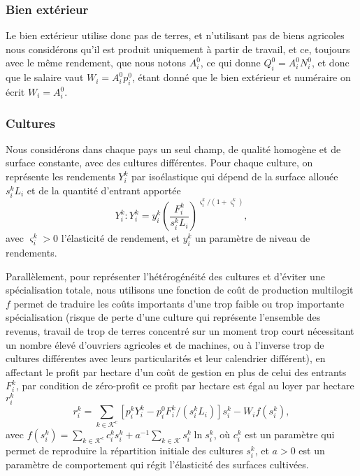 \subsubsection{Bien extérieur}
Le bien extérieur utilise donc pas de terres, et n’utilisant pas de biens agricoles nous considérons qu’il est produit uniquement à partir de travail, et ce, toujours avec le même rendement, que nous notons $A_i^0$, ce qui donne $Q_i^0 = A_i^0 N_i^0$, et donc que le salaire vaut $W_i = A_i^0 p_i^0$, étant donné que le bien extérieur et numéraire on écrit $W_i=A_i^0$.

\subsubsection{Cultures}

Nous considérons dans chaque pays un seul champ, de qualité homogène et de surface constante, avec des cultures différentes. Pour chaque culture, on représente les rendements $Y_i^k$ par isoélastique qui dépend de la surface allouée $s_i^k L_i$ et de la quantité d’entrant apportée
\begin{equation}\label{eq_yik}
	Y_i^k: Y_i^k = y_i^k \left( \frac{F_i^k}{s_i^k L_i} \right) ^{\varsigma_i^k/(1+\varsigma_i^k)},
\end{equation}
avec $\varsigma_i^k > 0$ l’élasticité de rendement, et $y_i^k$ un paramètre de niveau de rendements.

Parallèlement, pour représenter l’hétérogénéité des cultures et d’éviter une spécialisation totale, nous utilisons une fonction de coût de production multilogit $f$ permet de traduire les coûts importants d’une trop faible ou trop importante spécialisation (risque de perte d’une culture qui représente l’ensemble des revenus, travail de trop de terres concentré sur un moment trop court nécessitant un nombre élevé d’ouvriers agricoles et de machines, ou à l’inverse trop de cultures différentes avec leurs particularités et leur calendrier différent), en affectant le profit par hectare d’un coût de gestion en plus de celui des entrants $F_i^k$, par condition de zéro-profit ce profit par hectare est égal au loyer par hectare $r_i^k$
\begin{equation}\label{eq_rik}
	r_i^k = \sum_{k \in \mathcal{K}^c} [p_i^k Y_i^k - p_i^0 F_i^k/(s_i^k L_i)]s_i^k - W_i f(s_i^k),
\end{equation}
avec $f(s_i^k) = \sum_{k \in \mathcal{K}^c} c_i^k s_i^k + a^{-1} \sum_{k \in \mathcal{K}} s_i^k \ln s_i^k$, où $c_i^k$ est un paramètre qui permet de reproduire la répartition initiale des cultures $s_i^k$, et $a > 0$ est un paramètre de comportement qui régit l’élasticité des surfaces cultivées.

